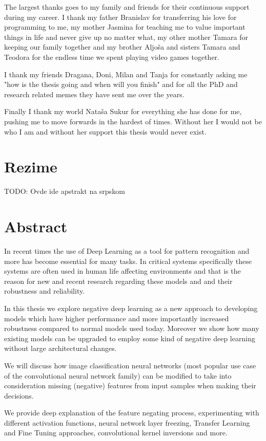 \documentclass[b5paper]{book}
\begin{document}
The largest thanks goes to my family and friends for their continuous support during my career. I thank my father Branislav for transferring his love for programming to me, my mother Jasmina for teaching me to value important things in life and never give up no matter what, my other mother Tamara for keeping our family together and my brother Aljoša and sisters Tamara and Teodora for the endless time we spent playing video games together.

I thank my friends Dragana, Doni, Milan and Tanja for constantly asking me "how is the thesis going and when will you finish" and for all the PhD and research related memes they have sent me over the years. 

Finally I thank my world Nataša Sukur for everything she has done for me, pushing me to move forwards in the hardest of times. Without her I would not be who I am and without her support this thesis would never exist.

\chapter{Rezime}

TODO: Ovde ide apstrakt na srpskom

\chapter{Abstract}

In recent times the use of Deep Learning as a tool for pattern recognition and more has become essential for many tasks. In critical systems specifically these systems are often used in human life affecting environments and that is the reason for new and recent research regarding these models and and their robustness and reliability. 

In this thesis we explore negative deep learning as a new approach to developing models which have higher performance and more importantly increased robustness compared to normal models used today. Moreover we show how many existing models can be upgraded to employ some kind of negative deep learning without large architectural changes.

We will discuss how image classification neural networks (most popular use case of the convolutional neural network family) can be modified to take into consideration missing (negative) features from input samples when making their decisions. 

We provide deep explanation of the feature negating process, experimenting with different activation functions, neural network layer freezing, Transfer Learning and Fine Tuning approaches, convolutional kernel inversions and more.
\end{document}
